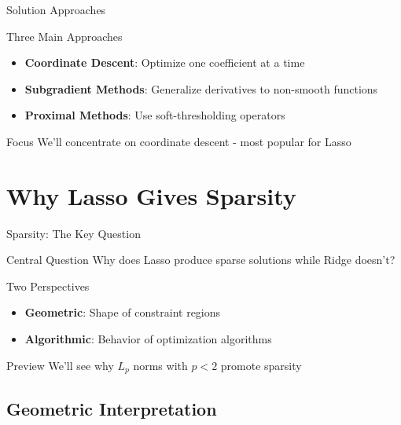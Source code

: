 \documentclass{beamer}
\begin{document}
\begin{frame}{Solution Approaches}
\begin{keypointsbox}{Three Main Approaches}
{\small
\begin{itemize}
\item \textbf{Coordinate Descent}: Optimize one coefficient at a time
\item \textbf{Subgradient Methods}: Generalize derivatives to non-smooth functions
\item \textbf{Proximal Methods}: Use soft-thresholding operators
\end{itemize}
}
\end{keypointsbox}

\begin{examplebox}{Focus}
We'll concentrate on coordinate descent - most popular for Lasso
\end{examplebox}
\end{frame}

\section{Why Lasso Gives Sparsity}

\begin{frame}{Sparsity: The Key Question}
\begin{alertbox}{Central Question}
Why does Lasso produce sparse solutions while Ridge doesn't?
\end{alertbox}
\pause

\begin{keypointsbox}{Two Perspectives}
\begin{itemize}
\item \textbf{Geometric}: Shape of constraint regions
\item \textbf{Algorithmic}: Behavior of optimization algorithms
\end{itemize}
\end{keypointsbox}
\pause

\begin{examplebox}{Preview}
We'll see why $L_p$ norms with $p < 2$ promote sparsity
\end{examplebox}
\end{frame}

\subsection{Geometric Interpretation}
\end{document}
